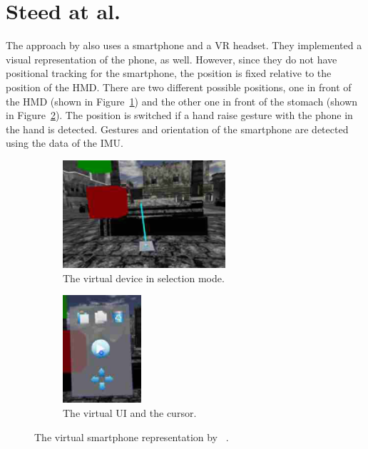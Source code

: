 \section{Steed at al.}\label{section:steed-2013}
The approach by \citeauthor{Steed.2013} also uses a smartphone and a \ac{VR} headset. They implemented a visual representation of the phone, as well. However, since they do not have positional tracking for the smartphone, the position is fixed relative to the position of the \ac{HMD}. There are two different possible positions, one in front of the \ac{HMD} (shown in Figure~\ref{fig:steed-2013-laser-pointer}) and the other one in front of the stomach (shown in Figure~\ref{fig:steed-2013-ui}). The position is switched if a hand raise gesture with the phone in the hand is detected. Gestures and orientation of the smartphone are detected using the data of the \ac{IMU}. 

\begin{figure}[H]
  \centering
  \begin{subfigure}{0.45\textwidth}%
    \centering%
    \includegraphics[height=4cm]{figures/related_work/steed_2013_laser_pointer.png}
    \caption{The virtual device in selection mode.}\label{fig:steed-2013-laser-pointer}%
  \end{subfigure}%
  \hspace{0.1\textwidth}%
  \begin{subfigure}{0.45\textwidth}%
    \centering%
    \includegraphics[height=4cm]{figures/related_work/steed_2013_ui.png}
    \caption{The virtual \ac{UI} and the cursor.}\label{fig:steed-2013-ui}
  \end{subfigure}%
  \caption[Virtual smartphone representation by Steep et al.]{The virtual smartphone representation by \citeauthor{Steed.2013}~\protect\cite[43]{Steed.2013}.}\label{fig:steed-2013}
\end{figure}

